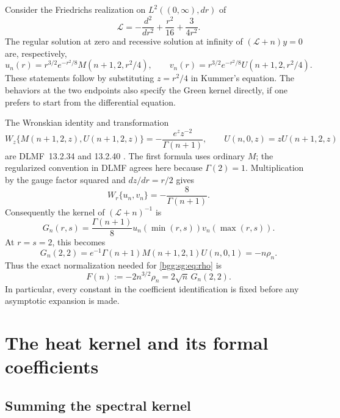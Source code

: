 \documentclass[11pt,a4paper]{article}
\numberwithin{equation}{section}
\theoremstyle{definition}
\theoremstyle{remark}
\theoremstyle{definition}
\begin{document}
Consider the Friedrichs realization on \(L^2((0,\infty),dr)\) of
\begin{equation}\label{bgg:sg:eq:operator}
 \mathscr L=-\frac{d^2}{dr^2}+\frac{r^2}{16}+\frac{3}{4r^2}.
\end{equation}
The regular solution at zero and recessive solution at infinity
of \((\mathscr L+n)y=0\) are, respectively,
\[
 u_n(r)=r^{3/2}e^{-r^2/8}M(n+1,2,r^2/4),\qquad
 v_n(r)=r^{3/2}e^{-r^2/8}U(n+1,2,r^2/4).
\]
These statements follow by substituting \(z=r^2/4\) in Kummer's
equation.  The behaviors at the two endpoints also specify the
Green kernel directly, if one prefers to start from the differential
equation.

The Wronskian identity and transformation
\[
 W_z\{M(n+1,2,z),U(n+1,2,z)\}
       =-\frac{e^zz^{-2}}{\Gamma(n+1)},\qquad
 U(n,0,z)=zU(n+1,2,z)
\]
are DLMF~13.2.34 and 13.2.40 \cite{dlmf-kummer}.  The first
formula uses ordinary \(M\); the regularized convention in DLMF agrees
here because \(\Gamma(2)=1\).
Multiplication by the gauge factor squared and \(dz/dr=r/2\)
gives
\[
 W_r\{u_n,v_n\}=-\frac8{\Gamma(n+1)}.
\]
Consequently the kernel of \((\mathscr L+n)^{-1}\) is
\[
 G_n(r,s)=\frac{\Gamma(n+1)}8u_n(\min(r,s))v_n(\max(r,s)).
\]
At \(r=s=2\), this becomes
\begin{equation}\label{bgg:sg:eq:greenrho}
 G_n(2,2)=e^{-1}\Gamma(n+1)M(n+1,2,1)U(n,0,1)
         =-n\rho_n.
\end{equation}
Thus the exact normalization needed for \eqref{bgg:sg:eq:rho} is
\begin{equation}\label{bgg:sg:eq:Fgreen}
 F(n):=-2n^{3/2}\rho_n=2\sqrt n\,G_n(2,2).
\end{equation}
In particular, every constant in the coefficient identification is
fixed before any asymptotic expansion is made.

\section{The heat kernel and its formal coefficients}\label{bgg:sg:sec:heat}

\subsection{Summing the spectral kernel}
\end{document}
